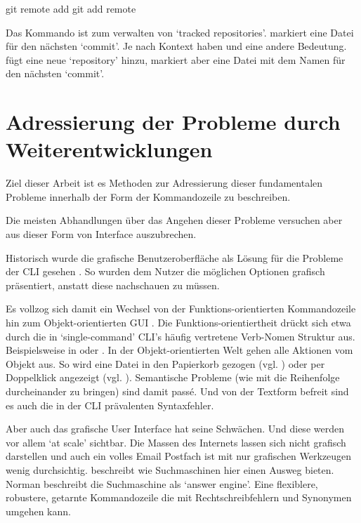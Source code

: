 \documentclass[oneside,bibliography=totocnumbered,BCOR=5mm]{scrbook}
\newenvironment{code}{\captionsetup{type=listing, skip=0pt}}{}
\begin{document}
\begin{code}
  \begin{shellcode}
git remote add
git add remote
  \end{shellcode}
  \medskip
\end{code}

Das Kommando  ist zum verwalten von `tracked repositories'.
 markiert eine Datei für den nächsten `commit'.
Je nach Kontext haben  und  eine andere Bedeutung.
 fügt eine neue `repository' hinzu,  markiert aber eine Datei mit dem Namen  für den
nächsten `commit'.

\section{Adressierung der Probleme durch Weiterentwicklungen}
\label{sec:weiterentwicklungen}

Ziel dieser Arbeit ist es Methoden zur Adressierung dieser fundamentalen
Probleme innerhalb der Form der Kommandozeile zu beschreiben.

Die meisten Abhandlungen über das Angehen dieser Probleme versuchen aber aus
dieser Form von Interface auszubrechen.

Historisch wurde die grafische Benutzeroberfläche als Lösung für die Probleme
der CLI gesehen \parencite{Norman_2007}. So wurden dem Nutzer die möglichen
Optionen grafisch präsentiert, anstatt diese nachschauen zu müssen. %

Es vollzog sich damit ein Wechsel von der Funktions-orientierten
Kommandozeile hin zum Objekt-orientierten GUI \parencite{nielson1993}. Die
Funktions-orientiertheit drückt sich etwa durch die in `single-command' CLI's
häufig vertretene Verb-Nomen Struktur aus. Beispielsweise in  oder . In der Objekt-orientierten Welt gehen alle
Aktionen vom Objekt aus. So wird eine Datei in den Papierkorb gezogen (vgl.
) oder per Doppelklick angezeigt (vgl. ). Semantische Probleme (wie mit  die Reihenfolge
durcheinander zu bringen) sind damit passé. Und von der Textform befreit sind es
auch die in der CLI prävalenten Syntaxfehler.

Aber auch das grafische User Interface hat seine Schwächen. Und diese werden vor
allem `at scale' sichtbar. Die Massen des Internets lassen sich nicht grafisch
darstellen und auch ein volles Email Postfach ist mit nur grafischen Werkzeugen
wenig durchsichtig. \cite{Norman_2007} beschreibt wie Suchmaschinen hier einen
Ausweg bieten. Norman beschreibt die Suchmaschine als `answer engine'. Eine
flexiblere, robustere, getarnte Kommandozeile die mit Rechtschreibfehlern und
Synonymen umgehen kann.
\end{document}
